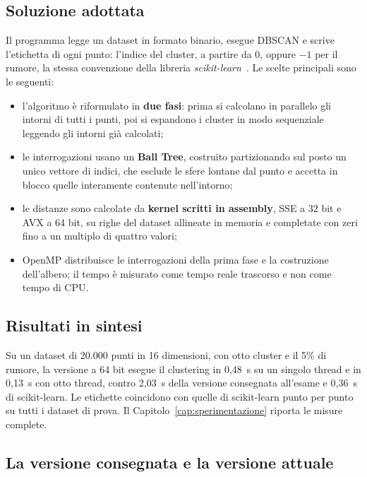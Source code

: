 \subsection*{Soluzione adottata}

Il programma legge un dataset in formato binario, esegue DBSCAN e scrive l'etichetta di ogni punto: l'indice del cluster, a partire da 0, oppure $-1$ per il rumore, la stessa convenzione della libreria \emph{scikit-learn}~\cite{sklearn}. Le scelte principali sono le seguenti:

\begin{itemize}
    \item l'algoritmo è riformulato in \textbf{due fasi}: prima si calcolano in parallelo gli intorni di tutti i punti, poi si espandono i cluster in modo sequenziale leggendo gli intorni già calcolati;
    \item le interrogazioni usano un \textbf{Ball Tree}, costruito partizionando sul posto un unico vettore di indici, che esclude le sfere lontane dal punto e accetta in blocco quelle interamente contenute nell'intorno;
    \item le distanze sono calcolate da \textbf{kernel scritti in assembly}, SSE a 32 bit e AVX a 64 bit, su righe del dataset allineate in memoria e completate con zeri fino a un multiplo di quattro valori;
    \item OpenMP distribuisce le interrogazioni della prima fase e la costruzione dell'albero; il tempo è misurato come tempo reale trascorso e non come tempo di CPU.
\end{itemize}

\subsection*{Risultati in sintesi}

Su un dataset di 20.000 punti in 16 dimensioni, con otto cluster e il 5\% di rumore, la versione a 64 bit esegue il clustering in 0,48~s su un singolo thread e in 0,13~s con otto thread, contro 2,03~s della versione consegnata all'esame e 0,36~s di scikit-learn. Le etichette coincidono con quelle di scikit-learn punto per punto su tutti i dataset di prova. Il Capitolo~\ref{cap:sperimentazione} riporta le misure complete.

\subsection*{La versione consegnata e la versione attuale}

